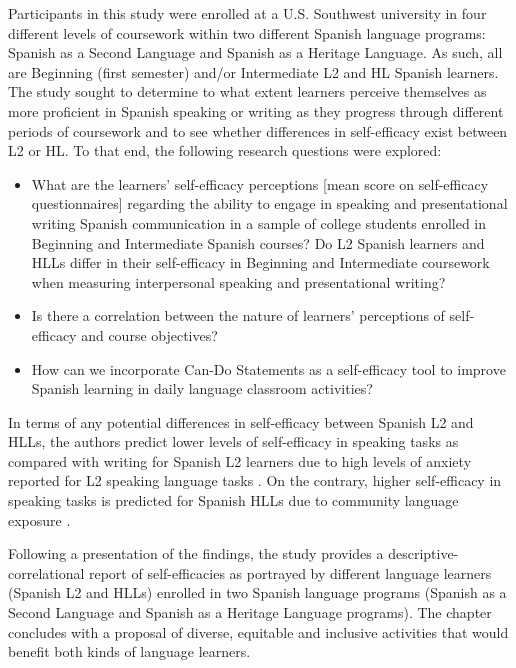 \documentclass[output=paper]{langscibook}
\begin{document}
Participants in this study were enrolled at a U.S. Southwest university in four different levels of coursework within two different Spanish language programs: Spanish as a Second Language and Spanish as a Heritage Language. As such, all are Beginning (first semester) and/or Intermediate L2 and HL Spanish learners. The study sought to determine to what extent learners perceive themselves as more proficient in Spanish speaking or writing as they progress through different periods of coursework and to see whether differences in self-efficacy exist between L2 or HL. To that end, the following research questions were explored:

\begin{itemize}
\item What are the learners’ self-ef\-fi\-ca\-cy perceptions [mean score on self-ef\-fi\-ca\-cy questionnaires] regarding the ability to engage in speaking and presentational writing Spanish communication in a sample of college students enrolled in Beginning and Intermediate Spanish courses? Do L2 Spanish learners and HLLs differ in their self-efficacy in Beginning and Intermediate coursework when measuring interpersonal speaking and presentational writing?

\item  Is there a correlation between the nature of learners’ perceptions of self-efficacy and      course objectives?

\item How can we incorporate Can-Do Statements as a self-efficacy tool to improve Spanish learning in daily language classroom activities?
\end{itemize}

In terms of any potential differences in self-efficacy between Spanish L2 and HLLs, the authors predict lower levels of self-efficacy in speaking tasks as compared with writing for Spanish L2 learners due to high levels of anxiety reported for L2 speaking language tasks \citep{MillsHerron2007}. On the contrary, higher self-efficacy in speaking tasks is predicted for Spanish HLLs due to community language exposure \citep{Valdés2000a}.

  Following a presentation of the findings, the study provides a descriptive-correlational report of self-efficacies as portrayed by different language learners (Spanish L2 and HLLs) enrolled in two Spanish language programs (Spanish as a Second Language and Spanish as a Heritage Language programs). The chapter concludes with a proposal of diverse, equitable and inclusive activities that would benefit both kinds of language learners.
\end{document}
